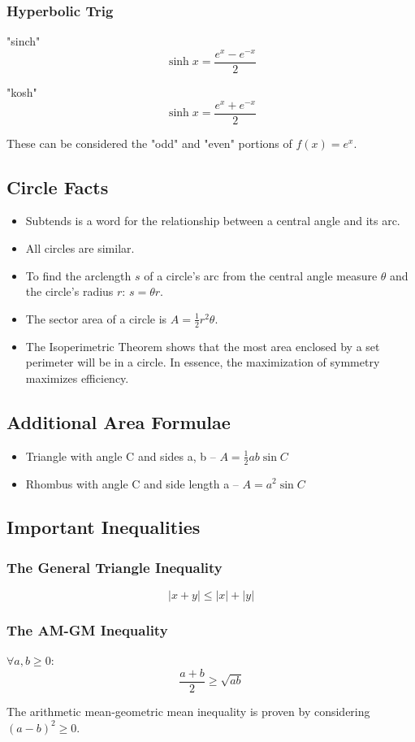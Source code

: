 \documentclass{article}
\begin{document}
\subsubsection{Hyperbolic Trig}
"sinch"
$$\sinh{x}=\frac{e^x-e^{-x}}{2}$$

"kosh"
$$\sinh{x}=\frac{e^x+e^{-x}}{2}$$

These can be considered the "odd" and "even" portions of $f(x)=e^x$.

\subsection{Circle Facts}
\begin{itemize}
    \item Subtends is a word for the relationship between a central angle and its arc.
    \item All circles are similar.
    \item To find the arclength $s$ of a circle's arc from the central angle measure $\theta$ and the circle's radius $r$: $s=\theta r$.
    \item The sector area of a circle is $A=\frac{1}{2}r^2\theta$.
    \item The Isoperimetric Theorem shows that the most area enclosed by a set perimeter will be in a circle. In essence, the maximization of symmetry maximizes efficiency.
\end{itemize}

\subsection{Additional Area Formulae}
\begin{itemize}
    \item Triangle with angle C and sides a, b -- $A=\frac{1}{2}ab\sin{C}$
    \item Rhombus with angle C and side length a -- $A=a^2\sin{C}$
\end{itemize}

\subsection{Important Inequalities}
\subsubsection{The General Triangle Inequality}
$$|x+y| \le |x| + |y|$$
\subsubsection{The AM-GM Inequality}
$\forall a,b \ge 0$:
$$\frac{a+b}{2}\ge\sqrt{ab}$$

The arithmetic mean-geometric mean inequality is proven by considering $(a-b)^2\ge0$.
\end{document}
